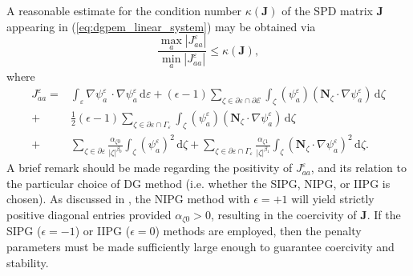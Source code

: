 A reasonable estimate for the condition number $\kappa (\bm{J})$ of the SPD matrix $\bm{J}$ appearing in (\ref{eq:dgpem_linear_system}) may be obtained via
\begin{equation}
	 \frac{\max_a |J^{\varepsilon}_{aa}|}{\min_a |J^{\varepsilon}_{aa}|} \leq \kappa (\bm{J}),
\end{equation}
where
\begin{align}
	J^{\varepsilon}_{aa} = & \int_{\varepsilon} \nabla \psi^{\varepsilon}_{a} \, \cdot \nabla \psi^{\varepsilon}_{a} \, \mathrm d \varepsilon + (\epsilon-1) \sum_{\zeta \in \partial \varepsilon \cap \partial \mathcal{E}} \int_{\zeta} \left( \psi^{\varepsilon}_a \right) \left( \bm{N}_{\zeta} \cdot \nabla \psi^{\varepsilon}_a \right) \, \mathrm d \zeta \nonumber \\ 
	+ & \frac{1}{2} (\epsilon-1) \sum_{\zeta \in \partial \varepsilon \cap \Gamma_\varepsilon} \int_{\zeta} \left( \psi^{\varepsilon}_a \right) \left( \bm{N}_{\zeta} \cdot \nabla \psi^{\varepsilon}_a \right) \, \mathrm d \zeta \nonumber \\
	+ & \sum_{\zeta \in \partial \varepsilon} \frac{\alpha_{\zeta0}}{|\zeta|^{\beta_0}} \int_{\zeta} \left( \psi_a^{\varepsilon} \right)^2 \, \mathrm d \zeta + \sum_{\zeta \in \partial \varepsilon \cap \Gamma_\varepsilon} \frac{\alpha_{\zeta1}}{|\zeta|^{\beta_1}} \int_{\zeta} \left( \bm{N}_{\zeta} \cdot \nabla \psi^{\varepsilon}_a \right)^2 \, \mathrm d \zeta.
\end{align}
A brief remark should be made regarding the positivity of $J^\varepsilon_{aa}$, and its relation to the particular choice of DG method (i.e. whether the SIPG, NIPG, or IIPG is chosen). As discussed in \cite{Riviere:08}, the NIPG method with $\epsilon = +1$ will yield strictly positive diagonal entries provided $\alpha_{\zeta0} > 0$, resulting in the coercivity of $\bm{J}$. If the SIPG ($\epsilon = -1$) or IIPG ($\epsilon = 0$) methods are employed, then the penalty parameters must be made sufficiently large enough to guarantee coercivity and stability.

